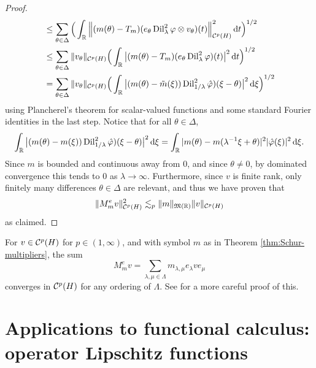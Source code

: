\begin{proof}
\begin{equation*}
\begin{aligned}
      &\leq \sum_{\theta \in \Delta} \Big( \int_{\mathbb{R}} \Big\| (m(\theta) - T_{m}) (e_{\theta} \operatorname{Dil}_{\lambda}^{2} \varphi \otimes v_{\theta})(t) \Big\|_{\mathcal{C}^{p}(H)}^{2}  \, \mathrm{d} t \Big)^{1/2} \\
      &\leq \sum_{\theta \in \Delta} \|v_{\theta}\|_{\mathcal{C}^{p}(H)} \Big( \int_{\mathbb{R}} \big| (m(\theta) - T_{m}) (e_{\theta} \operatorname{Dil}_{\lambda}^{2} \varphi)(t) \big|^{2}  \, \mathrm{d} t \Big)^{1/2} \\
      &= \sum_{\theta \in \Delta} \|v_{\theta}\|_{\mathcal{C}^{p}(H)} \Big( \int_{\mathbb{R}} \big| (m(\theta) - \tilde{m}(\xi)) \operatorname{Dil}_{1/\lambda}^{2} \hat{\varphi})(\xi - \theta) \big|^{2}  \, \mathrm{d} \xi \Big)^{1/2}
    \end{aligned}
  \end{equation*}
  using Plancherel's theorem for scalar-valued functions and some standard Fourier identities in the last step.
  Notice that for all $\theta \in \Delta$,
  \begin{equation*}
       \int_{\mathbb{R}} \big| (m(\theta) - m(\xi)) \operatorname{Dil}_{1/\lambda}^{2} \hat{\varphi})(\xi - \theta) \big|^{2}  \, \mathrm{d} \xi
      =  \int_{\mathbb{R}} |m(\theta) - m(\lambda^{-1}\xi + \theta)|^{2} |\hat{\varphi}(\xi)|^{2}  \, \mathrm{d} \xi .
  \end{equation*}
  Since $m$ is bounded and continuous away from $0$, and since $\theta \neq 0$, by dominated convergence this tends to $0$ as $\lambda \to \infty$.
  Furthermore, since $v$ is finite rank, only finitely many differences $\theta \in \Delta$ are relevant, and thus we have proven that
  \begin{equation*}
     \| M_{m}^{e} v \|_{\mathcal{C}^{p}(H)}^{2} \lesssim_{p} \|m\|_{\mathfrak{M}(\mathbb{R})} \|v\|_{\mathcal{C}^{p}(H)}
   \end{equation*}
   as claimed.
 \end{proof}

 \begin{rmk}
   For $v \in \mathcal{C}^{p}(H)$ for $p \in (1,\infty)$, and with symbol $m$ as in Theorem \ref{thm:Schur-multipliers}, the sum
   \begin{equation*} 
     M_{m}^{e} v = \sum_{\lambda,\mu \in \Lambda} m_{\lambda,\mu} e_{\lambda} v e_{\mu}
   \end{equation*}
   converges in $\mathcal{C}^{p}(H)$ for any ordering of $\Lambda$.
   See \cite[Theorem 5.4.3]{HNVW16} for a more careful proof of this.
 \end{rmk}

\section{Applications to functional calculus: operator Lipschitz functions}

